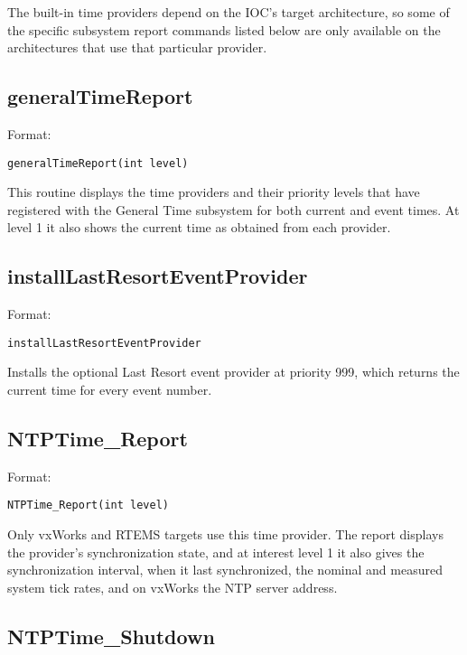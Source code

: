 The built-in time providers depend on the IOC's target architecture, so some of the specific subsystem report commands 
listed below are only available on the architectures that use that particular provider.

\subsection{generalTimeReport}

Format:

\begin{verbatim}
generalTimeReport(int level)
\end{verbatim}

This routine displays the time providers and their priority levels that have registered with the General Time subsystem  for 
both current and event times. At level 1 it also shows the current time as obtained from each provider.

\subsection{installLastResortEventProvider}

Format:

\begin{verbatim}
installLastResortEventProvider
\end{verbatim}

Installs the optional Last Resort event provider at priority 999, which returns the current time for every event number.

\subsection{NTPTime\_Report}

Format:

\begin{verbatim}
NTPTime_Report(int level)
\end{verbatim}

Only vxWorks and RTEMS targets use this time provider. The report displays the provider's synchronization state, and at 
interest level 1 it also gives the synchronization interval, when it last synchronized, the nominal and measured system tick 
rates, and on vxWorks the NTP server address.

\subsection{NTPTime\_Shutdown}

